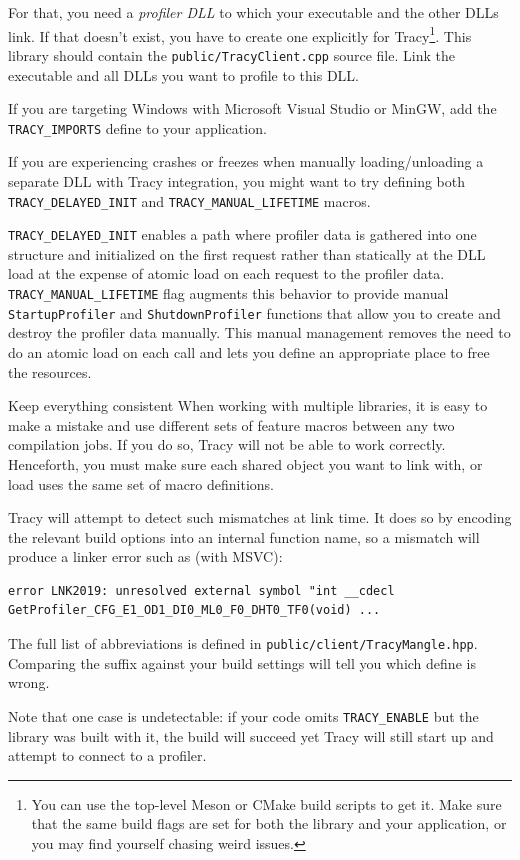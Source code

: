 \documentclass[hidelinks,titlepage,a4paper,twoside]{article}
\begin{document}
For that, you need a \emph{profiler DLL} to which your executable and the other DLLs link. If that doesn't exist, you have to create one explicitly for Tracy\footnote{You can use the top-level Meson or CMake build scripts to get it. Make sure that the same build flags are set for both the library and your application, or you may find yourself chasing weird issues.}. This library should contain the \texttt{public/TracyClient.cpp} source file. Link the executable and all DLLs you want to profile to this DLL.

If you are targeting Windows with Microsoft Visual Studio or MinGW, add the \texttt{TRACY\_IMPORTS} define to your application.

If you are experiencing crashes or freezes when manually loading/unloading a separate DLL with Tracy integration, you might want to try defining both \texttt{TRACY\_DELAYED\_INIT} and \texttt{TRACY\_MANUAL\_LIFETIME} macros.

\texttt{TRACY\_DELAYED\_INIT} enables a path where profiler data is gathered into one structure and initialized on the first request rather than statically at the DLL load at the expense of atomic load on each request to the profiler data. \texttt{TRACY\_MANUAL\_LIFETIME} flag augments this behavior to provide manual \texttt{StartupProfiler} and \texttt{ShutdownProfiler} functions that allow you to create and destroy the profiler data manually. This manual management removes the need to do an atomic load on each call and lets you define an appropriate place to free the resources.

\begin{bclogo}[
noborder=true,
couleur=black!5,
logo=\bcbombe
]{Keep everything consistent}
When working with multiple libraries, it is easy to make a mistake and use different sets of feature macros between any two compilation jobs. If you do so, Tracy will not be able to work correctly. Henceforth, you must make sure each shared object you want to link with, or load uses the same set of macro definitions.

Tracy will attempt to detect such mismatches at link time. It does so by encoding the relevant build options into an internal function name, so a mismatch will produce a linker error such as (with MSVC):

\begin{lstlisting}
error LNK2019: unresolved external symbol "int __cdecl GetProfiler_CFG_E1_OD1_DI0_ML0_F0_DHT0_TF0(void) ...
\end{lstlisting}

The full list of abbreviations is defined in \texttt{public/client/TracyMangle.hpp}. Comparing the suffix against your build settings will tell you which define is wrong.

Note that one case is undetectable: if your code omits \texttt{TRACY\_ENABLE} but the library was built with it, the build will succeed yet Tracy will still start up and attempt to connect to a profiler.
\end{bclogo}
\end{document}
